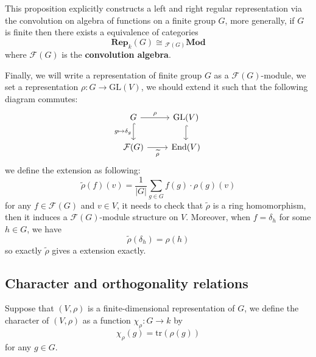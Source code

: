 \begin{remark}
    This proposition explicitly constructs a left and right regular representation via the convolution on algebra of functions on a finite group \(G\), more generally, if \(G\) is finite then there exists a equivalence of categories
    \[\mathbf{Rep}_k (G) \cong {}_{\mathcal{F}(G)}\mathbf{Mod}\]
    where \(\mathcal{F}(G)\) is the \textbf{convolution algebra}.
\end{remark}

Finally, we will write a representation of finite group \(G\) as a \(\mathcal{F}(G)\)-module, we set a representation \(\rho: G \to \mathrm{GL}(V)\), we should extend it such that the following diagram commutes:
\[\begin{tikzcd}
	G & {\mathrm{GL}(V)} \\
	{\mathcal{F}(G)} & {\mathrm{End}(V)}
	\arrow["\rho", from=1-1, to=1-2]
	\arrow["{g \mapsto \delta_g}"', hook, from=1-1, to=2-1]
	\arrow[hook, from=1-2, to=2-2]
	\arrow["\widetilde{\rho}"', from=2-1, to=2-2]
\end{tikzcd}\]
we define the extension as following:
\[\widetilde{\rho}(f)(v) = \frac{1}{|G|}\sum_{g\in G}f(g) \cdot \rho(g)(v)\]
for any \(f \in \mathcal{F}(G)\) and \(v \in V\), it needs to check that \(\widetilde{\rho}\) is a ring homomorphism, then it induces a \(\mathcal{F}(G)\)-module structure on \(V\). Moreover, when \(f = \delta_h\) for some \(h \in G\), we have
\[\widetilde{\rho}(\delta_h) = \rho(h)\]
so exactly \(\widetilde{\rho}\) gives a extension exactly.





\subsection{Character and orthogonality relations}

\begin{definition}
    Suppose that \((V,\rho)\) is a finite-dimensional representation of \(G\), we define the character of \((V,\rho)\) as a function \(\chi_\rho: G \to k\) by
    \[\chi_\rho(g) = \mathrm{tr}(\rho(g))\]
    for any \(g \in G\).
\end{definition}

